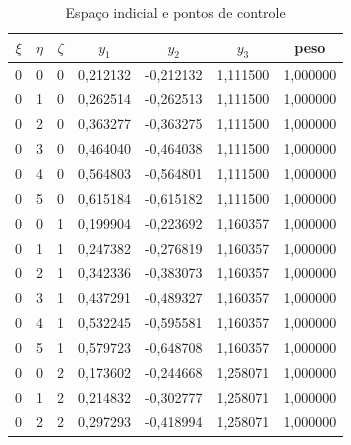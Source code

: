 \begin{apendicesenv}
\begin{table}[H] 
	\ABNTEXfontereduzida
	\caption{Espaço indicial e pontos de controle}
	\centering
	\scriptsize
	\begin{tabular}{ccccccc}
		\toprule
		\centering $\xi$ & $\eta$ & $\zeta$ & $y_1$ & $y_2$ & $y_3$ & peso \\
		\midrule
		0 & 0 & 0 & 0,212132 & -0,212132 & 1,111500 & 1,000000 \\
		0 & 1 & 0 & 0,262514 & -0,262513 & 1,111500 & 1,000000 \\
		0 & 2 & 0 & 0,363277 & -0,363275 & 1,111500 & 1,000000 \\
		0 & 3 & 0 & 0,464040 & -0,464038 & 1,111500 & 1,000000 \\
		0 & 4 & 0 & 0,564803 & -0,564801 & 1,111500 & 1,000000 \\
		0 & 5 & 0 & 0,615184 & -0,615182 & 1,111500 & 1,000000 \\
		0 & 0 & 1 & 0,199904 & -0,223692 & 1,160357 & 1,000000 \\
		0 & 1 & 1 & 0,247382 & -0,276819 & 1,160357 & 1,000000 \\
		0 & 2 & 1 & 0,342336 & -0,383073 & 1,160357 & 1,000000 \\
			0 & 3 & 1 & 0,437291 & -0,489327 & 1,160357 & 1,000000 \\
			0 & 4 & 1 & 0,532245 & -0,595581 & 1,160357 & 1,000000 \\
			0 & 5 & 1 & 0,579723 & -0,648708 & 1,160357 & 1,000000 \\
			0 & 0 & 2 & 0,173602 & -0,244668 & 1,258071 & 1,000000 \\
			0 & 1 & 2 & 0,214832 & -0,302777 & 1,258071 & 1,000000 \\
			0 & 2 & 2 & 0,297293 & -0,418994 & 1,258071 & 1,000000 \\
		\bottomrule
	\end{tabular}
	\label{tab:anexoB}
\end{table}

\pagebreak


\end{apendicesenv}

